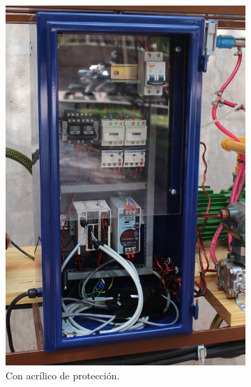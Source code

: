 \begin{figure}[t]
        \centering
        \begin{subfigure}[b]{0.48\textwidth}
\includegraphics[width=\textwidth]{Cap3-TableroElectrico/Images/IMG_5074.JPG}
 \caption{Con acrílico de protección.}
 \label{fig:fotoTableroAcr}
        \end{subfigure}%
\hfill
\begin{subfigure}[b]{0.48\textwidth}

\end{subfigure}
\end{figure}
